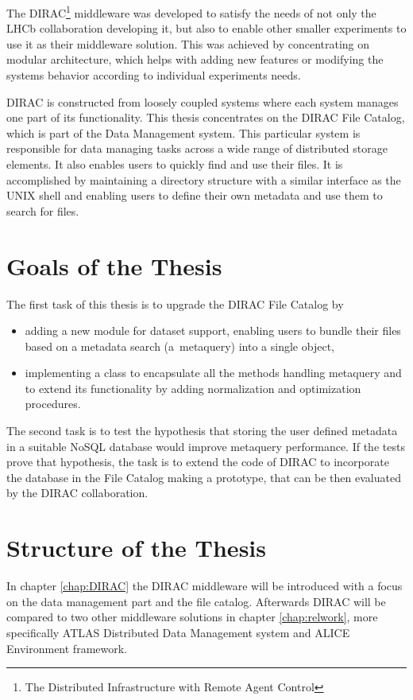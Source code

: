 The DIRAC\footnote{The Distributed Infrastructure with Remote Agent Control} middleware was developed to satisfy
the needs of not only the LHCb collaboration developing it, but also to enable other smaller experiments to use
it as their middleware solution. This was achieved by concentrating on modular architecture, which helps with
adding new features or modifying the systems behavior according to individual experiments needs. 

DIRAC is constructed from loosely coupled systems where each system manages one part of its functionality. This 
thesis concentrates on the DIRAC File Catalog, which is part of the Data Management system. This particular system 
is responsible for data managing tasks across a wide range of distributed storage elements. It also enables users to 
quickly find and use their files. It is accomplished by maintaining a 
directory structure with a similar interface as the UNIX shell and enabling users to define their own metadata
and use them to search for files.

\section*{Goals of the Thesis}

The first task of this thesis is to upgrade the DIRAC File Catalog by 
\begin{itemize}
\item adding a new module for dataset support, enabling users to bundle their files based on a metadata search 
(a~metaquery) into a single object,
\item implementing a class to encapsulate all the methods handling metaquery and to extend its 
functionality by adding normalization and optimization procedures.
\end{itemize}

The second task is to test the hypothesis that storing the user defined metadata in a suitable NoSQL database 
would improve metaquery performance. If the tests prove that hypothesis, the task is to extend the code of DIRAC 
to incorporate the database in the File Catalog making a prototype, that can be then evaluated by the DIRAC 
collaboration.

\section*{Structure of the Thesis}

In chapter \ref{chap:DIRAC} the DIRAC middleware will be introduced with a focus on the data management part and the 
file catalog. Afterwards DIRAC will be compared to two other middleware solutions in chapter \ref{chap:relwork}, 
more specifically ATLAS Distributed Data Management system and ALICE Environment framework.

